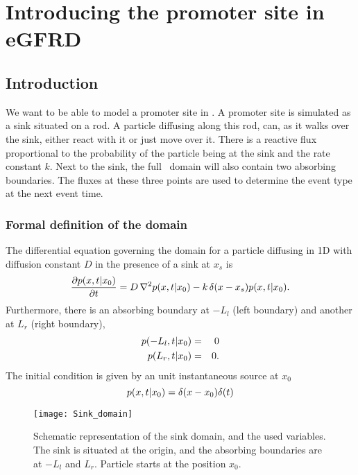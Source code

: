 \section{Introducing the promoter site in eGFRD}


\subsection{Introduction}

We want to be able to model a promoter site in \GFRD. A promoter site is simulated as a sink situated on a rod. A particle diffusing along this rod, can, as it walks over the sink, either react with it or just move over it. There is a reactive flux proportional to the probability of the particle being at the sink and the rate constant $k$. Next to the sink, the full \GFRD\, domain will also contain two absorbing boundaries. The fluxes at these three points are used to determine the event type at the next event time.

\subsubsection{Formal definition of the domain}

The differential equation governing the domain for a particle diffusing in 1D with diffusion constant $D$ in the presence of a sink at $x_s$ is
\begin{equation}
 \frac{\partial p(x,t|x_0)}{\partial t} = D \, \nabla ^2 p(x,t|x_0) - k \, \delta (x - x_s) p(x,t|x_0).
 \elabel{DE_I}
\end{equation}
Furthermore, there is an absorbing boundary at $-L_l$ (left boundary) and another at $L_r$ (right boundary),
\begin{eqnarray}
 p(-L_l,t|x_0) & = & 0 \\
 p(L_r,t|x_0) & = & 0.
\elabel{BC_I}
\end{eqnarray}
The initial condition is given by an unit instantaneous source at $x_0$
\begin{equation}
 p(x,t|x_0) = \delta(x-x_0)\delta(t)
\elabel{IC_I}
\end{equation}

\begin{figure}[bh]
\centering
\texttt{[image: Sink\_domain]}
\caption{ Schematic representation of the sink domain, and the used variables. The sink is situated at the origin, and the absorbing boundaries are at $-L_l$ and $L_r$. Particle starts at the position $x_0$.}
\end{figure}



